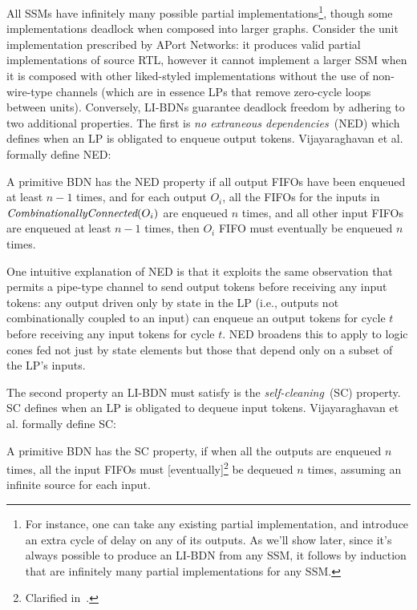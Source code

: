 All SSMs have infinitely many possible partial implementations\footnote{For
instance, one can take any existing partial implementation, and introduce an
extra cycle of delay on any of its outputs. As we'll show later, since it's
always possible to produce an LI-BDN from any SSM, it follows by induction that are infinitely many partial implementations
for any SSM.}, though some implementations deadlock when composed into larger graphs.
Consider the unit implementation prescribed by APort Networks: it produces valid partial implementations of
source RTL, however it cannot implement a larger SSM when it is composed
with other liked-styled implementations without the use of non-wire-type channels (which are in essence LPs that remove zero-cycle loops between units).
Conversely, LI-BDNs guarantee deadlock freedom by adhering to two additional properties.
The first is \emph{no extraneous dependencies}~(NED) which defines when an LP is obligated to enqueue output tokens. Vijayaraghavan et al.\cite{LIBDN} formally define NED:

\begin{widequote}
A primitive BDN has the NED property if all output FIFOs have been enqueued at least $n-1$ times,
and for each output $O_i$, all the FIFOs for the inputs in $\emph{CombinationallyConnected}(O_i)$
are enqueued $n$ times, and all other input FIFOs are enqueued at least $n-1$ times, then $O_i$ FIFO
must eventually be enqueued $n$ times.
\end{widequote}\label{def:ned}

One intuitive explanation of NED is that it exploits the same observation that
permits a pipe-type channel to send output tokens before receiving any input
tokens: any output driven only by state in the LP (i.e., outputs not
combinationally coupled to an input) can enqueue an output tokens for cycle
$t$ before receiving any input tokens for cycle $t$. NED broadens this to apply to logic cones fed not just by state
elements but those that depend only on a subset of the LP's inputs.

The second property an LI-BDN must satisfy is the \emph{self-cleaning}~(SC) property. SC 
defines when an LP is obligated to dequeue input tokens. Vijayaraghavan et al.\cite{LIBDN} formally define SC:

\begin{widequote}
A primitive BDN has the SC property, if when all the
outputs are enqueued $n$ times, all the input FIFOs must
[eventually]\footnote{Clarified in~\cite{LIBDNMasters}.} be dequeued $n$ times, assuming an infinite source for each
input.
\end{widequote}\label{def:sc}

